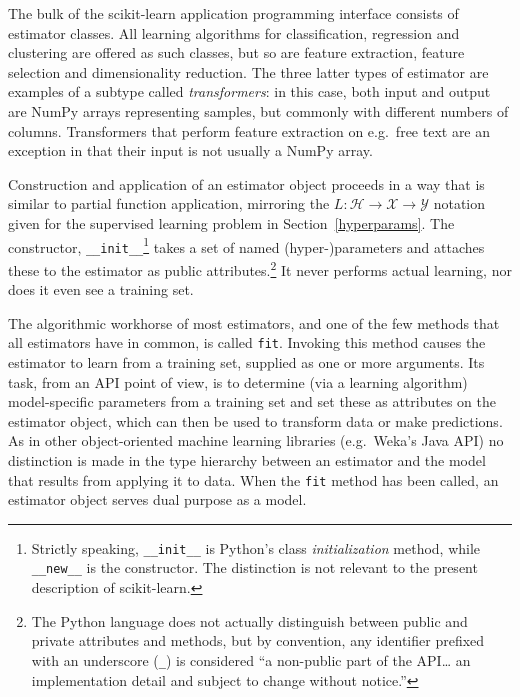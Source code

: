 \documentclass[a4paper,twocolumn]{article}
\begin{document}

The bulk of the scikit-learn application programming interface
consists of estimator classes.
All learning algorithms for classification, regression and clustering
are offered as such classes,
but so are feature extraction, feature selection and dimensionality reduction.
The three latter types of estimator are examples of a subtype
called \textit{transformers}:
in this case, both input and output are NumPy arrays representing samples,
but commonly with different numbers of columns.
Transformers that perform feature extraction on e.g.\ free text
are an exception in that their input is not usually a NumPy array.

Construction and application of an estimator object
proceeds in a way that is similar to partial function application,
mirroring the $L : \mathcal{H} \to \mathcal{X} \to \mathcal{Y}$ notation
given for the supervised learning problem in Section~\ref{hyperparams}.
The constructor, \texttt{\_\_init\_\_}\footnote{
  Strictly speaking, \texttt{\_\_init\_\_} is Python's
  class \textit{initialization} method,
  while \texttt{\_\_new\_\_} is the constructor.
  The distinction is not relevant to the present description of scikit-learn.}
takes a set of named (hyper-)parameters
and attaches these to the estimator as public attributes.\footnote{
  The Python language does not actually distinguish between public and private
  attributes and methods,
  but by convention, any identifier prefixed with an underscore (\texttt{\_})
  is considered ``a non-public part of the API\ldots
  an implementation detail and subject to change without notice.''
  }
It never performs actual learning, nor does it even see a training set.

The algorithmic workhorse of most estimators, and one of the few methods
that all estimators have in common, is called \texttt{fit}.
Invoking this method causes the estimator to learn from a training set,
supplied as one or more arguments.
Its task, from an API point of view,
is to determine (via a learning algorithm) model-specific parameters
from a training set and set these as attributes on the estimator object,
which can then be used to transform data or make predictions.
As in other object-oriented machine learning libraries
(e.g.\ Weka's Java API)
no distinction is made in the type hierarchy
between an estimator and the model that results from applying it to data.
When the \texttt{fit} method has been called,
an estimator object serves dual purpose as a model.
\end{document}
